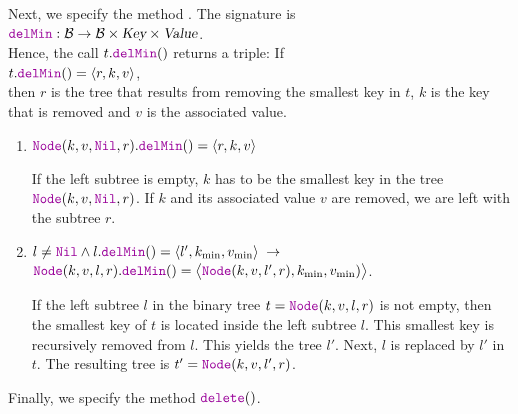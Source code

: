Next, we specify the  method .  The signature is
\\[0.2cm]
\hspace*{1.3cm}
$\mytt{delMin}:\mathcal{B} \rightarrow \mathcal{B} \times \textsl{Key} \times \textsl{Value}$.
\\[0.2cm]
Hence, the call $t.\mytt{delMin}()$ returns a triple: If 
\\[0.2cm]
\hspace*{1.3cm}
$t.\mytt{delMin}() = \langle r,k,v \rangle$,
\\[0.2cm]
then $r$ is the tree that  results from
removing the smallest key in $t$, $k$ is the key that is removed and $v$ is the associated value.
\begin{enumerate}
\item $\mytt{Node}(k, v, \mytt{Nil}, r).\mytt{delMin}() = \langle r, k, v\rangle$

      If the left subtree is empty, $k$ has to be the smallest key in the tree 
      $\mytt{Node}(k, v, \mytt{Nil}, r)$.  If $k$ and its associated value $v$ are removed, we are left with the subtree $r$.
\item $l\not= \mytt{Nil} \wedge l.\mytt{delMin}() = \langle l',k_{\textrm{min}}, v_{\textrm{min}}\rangle \;\rightarrow$ \\[0.2cm]
       \hspace*{1.3cm} 
       $\mytt{Node}(k, v, l, r).\mytt{delMin}() = \bigl\langle\mytt{Node}(k, v, l', r), k_{\textrm{min}}, v_{\textrm{min}})\bigr\rangle$.

      If the left subtree $l$ in the binary tree $t = \mytt{Node}(k, v, l, r)$
      is not empty, then the smallest key of  $t$ is located inside the left subtree $l$.
      This smallest key is recursively removed from  $l$. This yields the tree 
      $l'$.  Next,  $l$ is replaced by $l'$ in $t$.  The resulting tree is
      $t' = \mytt{Node}(k, v, l', r)$.
\end{enumerate}
Finally, we specify the method $\mytt{delete}()$.
